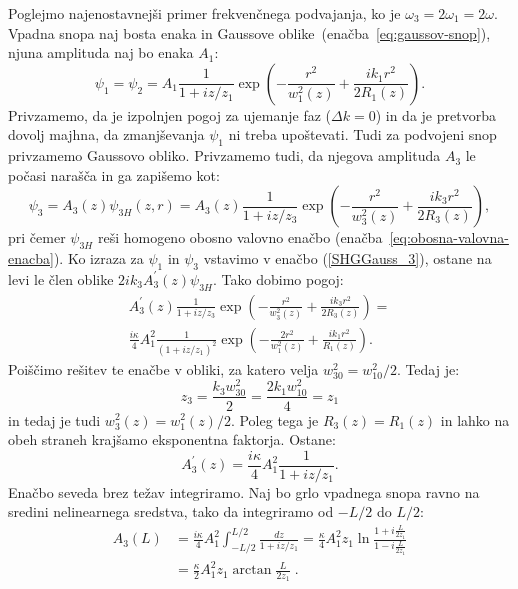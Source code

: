 Poglejmo najenostavnejši primer frekvenčnega podvajanja, ko je 
$\omega_{3}=2\omega_{1}=2\omega$.
Vpadna snopa naj bosta enaka in Gaussove oblike~(enačba~\ref{eq:gaussov-snop}), 
njuna amplituda  naj bo enaka $A_1$:
\begin{equation}
\psi_{1} = \psi_2 = A_{1}\frac{1}{1+iz/z_1}
\exp\left(-\frac{r^{2}}{w_1^{2}(z)}+\frac{ik_1r^{2}}{2R_1(z)}\right)\!\!.
\label{8.21}
\end{equation}
Privzamemo, da je izpolnjen pogoj za ujemanje faz 
($\Delta k=0$) in da je pretvorba dovolj majhna, da zmanjševanja $\psi_{1}$
ni treba upoštevati. Tudi za podvojeni snop privzamemo Gaussovo 
obliko. Privzamemo tudi, da njegova amplituda $A_3$ le počasi narašča in 
ga zapišemo kot:
\begin{equation}
\psi_{3}=A_{3}(z)\psi_{3H}(z,r)=A_{3}(z)\frac{1}{1+iz/z_{3}}
\exp\left(-\frac{r^{2}}{w_{3}^{2}(z)}+\frac{ik_{3}r^{2}}{2R_{3}(z)}\right)\!\!,
\label{8.22}
\end{equation}
pri čemer $\psi_{3H}$ reši homogeno obosno valovno 
enačbo (enačba~\ref{eq:obosna-valovna-enacba}). Ko izraza za $\psi_{1}$
in $\psi_{3}$ vstavimo v enačbo (\ref{SHGGauss_3}),
ostane na levi le člen oblike $2ik_{3}A_{3}^{\prime}(z)\psi_{3H}$. Tako dobimo pogoj:
\begin{equation}
\begin{split}
A_{3}^{\prime}(z)\frac{1}{1+iz/z_3}\exp\left(-\frac{r^{2}}{w_{3}^{2}(z)}+\frac{ik_{3}r^{2}}
{2R_{3}(z)}\right)=\\
\frac{i\kappa}{4}A_{1}^{2}\frac{1}{(1+iz/z_{1})^{2}}\exp\left(-\frac{2r^{2}}
{w_{1}^{2}(z)}+\frac{ik_{1}r^{2}}{R_{1}(z)}\right)\!\!.
\label{8.23}
\end{split}
\end{equation}
Poiščimo rešitev te enačbe v obliki, za katero velja $w_{30}^{2}=w_{10}^{2}/2$. Tedaj je:
\begin{equation}
z_{3}=\frac{k_{3}w_{30}^{2}}{2}=\frac{2k_{1}w_{10}^{2}}{4}=z_{1}
\end{equation}
in tedaj je tudi $w_{3}^{2}(z)=w_{1}^{2}(z)/2$. Poleg tega je $R_{3}(z)=R_{1}(z)$
in lahko na obeh straneh krajšamo eksponentna faktorja. Ostane: 
\begin{equation}
A_{3}^{\prime}(z)=\frac{i\kappa}{4}A_{1}^{2}\frac{1}{1+iz/z_1}.
\label{8.24}
\end{equation}
Enačbo seveda brez težav integriramo. Naj bo grlo vpadnega
snopa ravno na sredini nelinearnega sredstva, tako da integriramo
od $-L/2$ do $L/2$:
\begin{align}
A_{3}(L) & =  \frac{i\kappa}{4}A_{1}^{2}\int_{-L/2}^{L/2}\frac{dz}{1+iz/z_1} 
  = \frac{\kappa}{4}A_{1}^{2}z_{1}\ln\frac{1+i\frac{L}{2z_{1}}}{1-i\frac{L}{2z_{1}}} \nonumber \\
 & =  \frac{\kappa}{2}A_{1}^{2}z_{1}\arctan\frac{L}{2z_{1}}\;.
\end{align}
